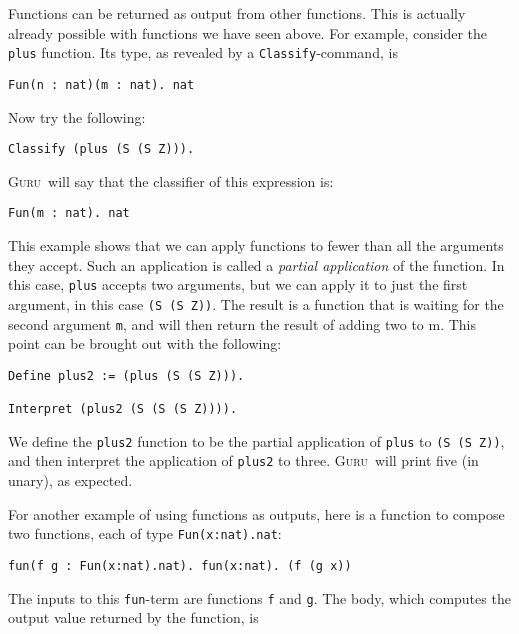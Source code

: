 \documentclass{book}[12pt]
\newcommand{\guru}[0]{\textsc{Guru}}
\begin{document}
Functions can be returned as output from other functions.  This is
actually already possible with functions we have seen above.  For
example, consider the \texttt{plus} function.  Its type, as revealed
by a \texttt{Classify}-command, is 

\begin{verbatim}
Fun(n : nat)(m : nat). nat
\end{verbatim}

\noindent Now try the following:

\begin{verbatim}
Classify (plus (S (S Z))).
\end{verbatim}

\noindent \guru\ will say that the classifier of this expression is:

\begin{verbatim}
Fun(m : nat). nat
\end{verbatim}

\noindent This example shows that we can apply functions to fewer than
all the arguments they accept.  Such an application is called a
\emph{partial application} of the function.  In this case,
\texttt{plus} accepts two arguments, but we can apply it to just the
first argument, in this case \texttt{(S (S Z))}.  The result is a
function that is waiting for the second argument \texttt{m}, and will
then return the result of adding two to m.  This point can be brought
out with the following:

\begin{verbatim}
Define plus2 := (plus (S (S Z))).

Interpret (plus2 (S (S (S Z)))).
\end{verbatim}

\noindent We define the \texttt{plus2} function to be the partial
application of \texttt{plus} to \texttt{(S (S Z))}, and then interpret
the application of \texttt{plus2} to three.  \guru\ will print five
(in unary), as expected.

For another example of using functions as outputs, here is a function
to compose two functions, each of type \texttt{Fun(x:nat).nat}:

\begin{verbatim}
fun(f g : Fun(x:nat).nat). fun(x:nat). (f (g x))
\end{verbatim}

\noindent The inputs to this \texttt{fun}-term are functions \texttt{f} and \texttt{g}.
The body, which computes the output value returned by the function, is
\end{document}
